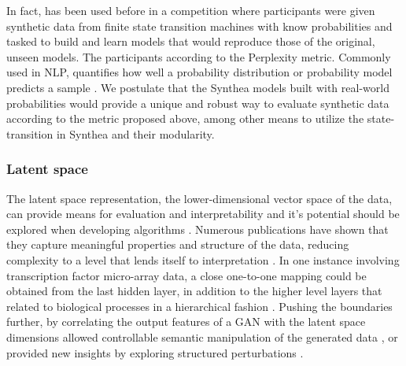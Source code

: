 In fact, has been used before in a competition where participants were given synthetic data from finite state transition machines with know probabilities and tasked to build and learn models that would reproduce those of the original, unseen models. The participants according to the Perplexity metric. Commonly used in NLP, quantifies how well a probability distribution or probability model predicts a sample \cite{Verwer_2013}. We postulate that the Synthea models built with real-world probabilities would provide a unique and robust way to evaluate synthetic data according to the metric proposed above, among other means to utilize the state-transition in Synthea and their modularity.

\subsubsection{Latent space \label{sec:latent-space}}
The latent space representation, the lower-dimensional vector space of the data, can provide means for evaluation and interpretability and it's potential should be explored when developing algorithms \cite{lui2019-latent}. Numerous publications have shown that they capture meaningful properties and structure of the data, reducing complexity to a level that lends itself to interpretation \cite{Way2020, Koumakis2020}. In one instance involving transcription factor micro-array data, a close one-to-one mapping could be obtained from the last hidden layer, in addition to the higher level layers that related to biological processes in a hierarchical fashion \cite{chen2016-latentyeast}. Pushing the boundaries further, by correlating the output features of a GAN with the latent space dimensions allowed controllable semantic manipulation of the generated data \cite{Wang2020latent,Ding2020latent,Li2020latent}, or provided new insights by exploring structured perturbations \cite{lui2019-latent}.

